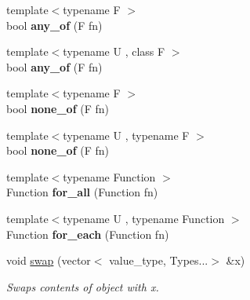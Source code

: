 \begin{DoxyCompactItemize}
\item 
\hypertarget{classheterogeneous_1_1vector_3_01_t_00_01_types_8_8_8_4_a04f7fcbc424dfd092b8a7ac1fdeee827}{}{\footnotesize template$<$typename F $>$ }\\bool {\bfseries any\+\_\+of} (F fn)\label{classheterogeneous_1_1vector_3_01_t_00_01_types_8_8_8_4_a04f7fcbc424dfd092b8a7ac1fdeee827}

\item 
\hypertarget{classheterogeneous_1_1vector_3_01_t_00_01_types_8_8_8_4_ac54983095a52b065b794b90e03b40f71}{}{\footnotesize template$<$typename U , class F $>$ }\\bool {\bfseries any\+\_\+of} (F fn)\label{classheterogeneous_1_1vector_3_01_t_00_01_types_8_8_8_4_ac54983095a52b065b794b90e03b40f71}

\item 
\hypertarget{classheterogeneous_1_1vector_3_01_t_00_01_types_8_8_8_4_afb2ee29f0b09da3ef603440c872ad996}{}{\footnotesize template$<$typename F $>$ }\\bool {\bfseries none\+\_\+of} (F fn)\label{classheterogeneous_1_1vector_3_01_t_00_01_types_8_8_8_4_afb2ee29f0b09da3ef603440c872ad996}

\item 
\hypertarget{classheterogeneous_1_1vector_3_01_t_00_01_types_8_8_8_4_a6439b7983c3793df560bd8f3de1d9ca0}{}{\footnotesize template$<$typename U , typename F $>$ }\\bool {\bfseries none\+\_\+of} (F fn)\label{classheterogeneous_1_1vector_3_01_t_00_01_types_8_8_8_4_a6439b7983c3793df560bd8f3de1d9ca0}

\item 
\hypertarget{classheterogeneous_1_1vector_3_01_t_00_01_types_8_8_8_4_aba16b846f22940aa69d2165513dbe11c}{}{\footnotesize template$<$typename Function $>$ }\\Function {\bfseries for\+\_\+all} (Function fn)\label{classheterogeneous_1_1vector_3_01_t_00_01_types_8_8_8_4_aba16b846f22940aa69d2165513dbe11c}

\item 
\hypertarget{classheterogeneous_1_1vector_3_01_t_00_01_types_8_8_8_4_a1b19de695ce9fe1ee35671f74b882c1a}{}{\footnotesize template$<$typename U , typename Function $>$ }\\Function {\bfseries for\+\_\+each} (Function fn)\label{classheterogeneous_1_1vector_3_01_t_00_01_types_8_8_8_4_a1b19de695ce9fe1ee35671f74b882c1a}

\item 
\hypertarget{classheterogeneous_1_1vector_3_01_t_00_01_types_8_8_8_4_a1ea84c9e6597fc65ad39671073b688b3}{}void \hyperlink{classheterogeneous_1_1vector_3_01_t_00_01_types_8_8_8_4_a1ea84c9e6597fc65ad39671073b688b3}{swap} (vector$<$ value\+\_\+type, Types...$>$ \&x)\label{classheterogeneous_1_1vector_3_01_t_00_01_types_8_8_8_4_a1ea84c9e6597fc65ad39671073b688b3}

\begin{DoxyCompactList}\small\item\em Swaps contents of object with x. \end{DoxyCompactList}\end{DoxyCompactItemize}
